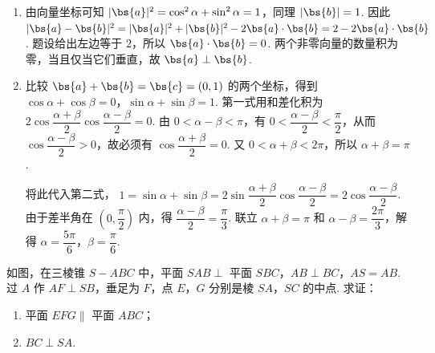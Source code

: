 \begin{solution}
\begin{enumerate}
\item 由向量坐标可知 \(\lvert\bs{a}\rvert^2=\cos^2\alpha+\sin^2\alpha=1\)，同理 \(\lvert\bs{b}\rvert=1\). 因此
\(\lvert\bs{a}-\bs{b}\rvert^2=\lvert\bs{a}\rvert^2+\lvert\bs{b}\rvert^2-2\bs{a}\cdot\bs{b}=2-2\bs{a}\cdot\bs{b}\). 题设给出左边等于 \(2\)，所以 \(\bs{a}\cdot\bs{b}=0\). 两个非零向量的数量积为零，当且仅当它们垂直，故 \(\bs{a}\perp\bs{b}\).

\item 比较 \(\bs{a}+\bs{b}=\bs{c}=(0,1)\) 的两个坐标，得到
\(\cos\alpha+\cos\beta=0\)，\(\sin\alpha+\sin\beta=1\). 第一式用和差化积为
\(2\cos\dfrac{\alpha+\beta}{2}\cos\dfrac{\alpha-\beta}{2}=0\). 由 \(0<\alpha-\beta<\pi\)，有 \(0<\dfrac{\alpha-\beta}{2}<\dfrac\pi2\)，从而 \(\cos\dfrac{\alpha-\beta}{2}>0\)，故必须有 \(\cos\dfrac{\alpha+\beta}{2}=0\). 又 \(0<\alpha+\beta<2\pi\)，所以 \(\alpha+\beta=\pi\).

将此代入第二式，
\(1=\sin\alpha+\sin\beta=2\sin\dfrac{\alpha+\beta}{2}\cos\dfrac{\alpha-\beta}{2}=2\cos\dfrac{\alpha-\beta}{2}\). 由于差半角在 \(\left(0,\dfrac\pi2\right)\) 内，得 \(\dfrac{\alpha-\beta}{2}=\dfrac\pi3\). 联立 \(\alpha+\beta=\pi\) 和 \(\alpha-\beta=\dfrac{2\pi}3\)，解得 \(\alpha=\dfrac{5\pi}{6}\)，\(\beta=\dfrac\pi6\).
\end{enumerate}
\end{solution}

\begin{problem}
如图，在三棱锥 \(S-ABC\) 中，平面 \(SAB\perp\) 平面 \(SBC\)，\(AB\perp BC\)，\(AS=AB\). 过 \(A\) 作 \(AF\perp SB\)，垂足为 \(F\)，点 \(E\)，\(G\) 分别是棱 \(SA\)，\(SC\) 的中点. 求证：

\begin{enumerate}
\item 平面 \(EFG\parallel\) 平面 \(ABC\)；
\item \(BC\perp SA\).
\end{enumerate}

\end{problem}

